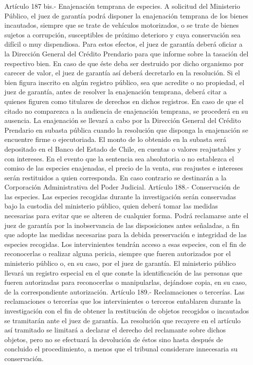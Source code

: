     Artículo 187 bis.- Enajenación temprana de especies. A solicitud del Ministerio Público, el juez de garantía podrá disponer la enajenación temprana de los bienes incautados, siempre que se trate de vehículos motorizados, o se trate de bienes sujetos a corrupción, susceptibles de próximo deterioro y cuya conservación sea difícil o muy dispendiosa.
    Para estos efectos, el juez de garantía deberá oficiar a la Dirección General del Crédito Prendario para que informe sobre la tasación del respectivo bien. En caso de que éste deba ser destruido por dicho organismo por carecer de valor, el juez de garantía así deberá decretarlo en la resolución.
    Si el bien figura inscrito en algún registro público, sea que acredite o no propiedad, el juez de garantía, antes de resolver la enajenación temprana, deberá citar a quienes figuren como titulares de derechos en dichos registros. En caso de que el citado no comparezca a la audiencia de enajenación temprana, se procederá en su ausencia.
    La enajenación se llevará a cabo por la Dirección General del Crédito Prendario en subasta pública cuando la resolución que disponga la enajenación se encuentre firme o ejecutoriada.
    El monto de lo obtenido en la subasta será depositado en el Banco del Estado de Chile, en cuentas o valores reajustables y con intereses.
    En el evento que la sentencia sea absolutoria o no establezca el comiso de las especies enajenadas, el precio de la venta, sus reajustes e intereses serán restituidos a quien corresponda. En caso contrario se destinarán a la Corporación Administrativa del Poder Judicial.
    Artículo 188.- Conservación de las especies. Las especies recogidas durante la investigación serán conservadas bajo la custodia del ministerio público, quien deberá tomar las medidas necesarias para evitar que se alteren de cualquier forma.
    Podrá reclamarse ante el juez de garantía por la inobservancia de las disposiciones antes señaladas, a fin que adopte las medidas necesarias para la debida preservación e integridad de las especies recogidas.
    Los intervinientes tendrán acceso a esas especies, con el fin de reconocerlas o realizar alguna pericia, siempre que fueren autorizados por el ministerio público o, en su caso, por el juez de garantía. El ministerio público llevará un registro especial en el que conste la identificación de las personas que fueren autorizadas para reconocerlas o manipularlas, dejándose copia, en su caso, de la correspondiente autorización.
    Artículo 189.- Reclamaciones o tercerías. Las reclamaciones o tercerías que los intervinientes o terceros entablaren durante la investigación con el fin de obtener la restitución de objetos recogidos o incautados se tramitarán ante el juez de garantía. La resolución que recayere en el artículo así tramitado se limitará a declarar el derecho del reclamante sobre dichos objetos, pero no se efectuará la devolución de éstos sino hasta después de concluido el procedimiento, a menos que el tribunal considerare innecesaria su conservación.
